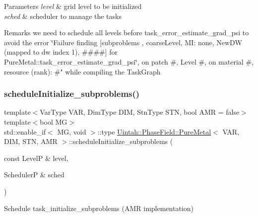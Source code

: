 \begin{DoxyParams}{Parameters}
{\em level} & grid level to be initialized \\
\hline
{\em sched} & scheduler to manage the tasks\\
\hline
\end{DoxyParams}
\begin{DoxyRemark}{Remarks}
we need to schedule all levels before task\+\_\+error\+\_\+estimate\+\_\+grad\+\_\+psi to avoid the error \char`\"{}\+Failure finding \mbox{[}subproblems , coarse\+Level, M\+I\+: none, New\+D\+W
(mapped to dw index 1), \#\#\#\#\mbox{]} for Pure\+Metal\+::task\+\_\+error\+\_\+estimate\+\_\+grad\+\_\+psi\char`\"{}, on patch \#, Level \#, on material \#, resource (rank)\+: \#" while compiling the Task\+Graph 
\end{DoxyRemark}
\mbox{\label{classUintah_1_1PhaseField_1_1PureMetal_a1ec4eefc3acacbabe19312052f373141}} 
\subsubsection{\texorpdfstring{schedule\+Initialize\+\_\+subproblems()}{scheduleInitialize\_subproblems()}\hspace{0.1cm}{\footnotesize\ttfamily [2/2]}}
{\footnotesize\ttfamily template$<$Var\+Type V\+AR, Dim\+Type D\+IM, Stn\+Type S\+TN, bool A\+MR = false$>$ \\
template$<$bool MG$>$ \\
std\+::enable\+\_\+if$<$ MG, void $>$\+::type \hyperlink{classUintah_1_1PhaseField_1_1PureMetal}{Uintah\+::\+Phase\+Field\+::\+Pure\+Metal}$<$ V\+AR, D\+IM, S\+TN, A\+MR $>$\+::schedule\+Initialize\+\_\+subproblems (\begin{DoxyParamCaption}\item[{const LevelP \&}]{level,  }\item[{SchedulerP \&}]{sched }\end{DoxyParamCaption})\hspace{0.3cm}{\ttfamily [protected]}}



Schedule task\+\_\+initialize\+\_\+subproblems (A\+MR implementation) 

